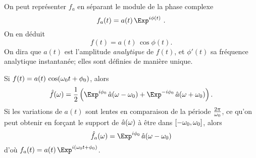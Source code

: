 On peut repr\'{e}senter $f_a$ en s\'{e}parant le module de la phase 
complexe
\[
f_a (t) = a (t)\, \Exp^{i \phi (t)}~.
\]
On en d\'{e}duit
\[
f(t) = a(t) \,\cos \phi(t) .
\]
On dira que $a(t)$ est l'amplitude {\it analytique} de $f(t)$, et 
$\phi'(t) $ sa fr\'{e}quence analytique
instantan\'{e}e; elles sont d\'{e}finies 
de mani\`{e}re unique.

\begin{Example}
\item Si $f(t) = a(t)\, \cos ({\omega}_0 t + \phi_0)$, alors
\[
\hat f (\om) =  \frac 1 2
\left(
\Exp^{i \phi_0} \, \hat a(\om - \om_0) +
\Exp^{-i \phi_0} \, \hat a(\om +\om_0)
\right).
\]
Si les variations de $a(t)$ sont lentes en comparaison de la 
p\'{e}riode $\frac {2 \pi} {{\omega}_0}$, ce qu'on peut obtenir en 
for\c{c}ant le support de
$\hat a ({\omega})$ \`{a} \^{e}tre dans $[-{\omega}_0,{\omega}_0]$, alors
\[
\hat f_a (\om) = \Exp^{i \phi_0} \, \hat a(\om - \om_0)
\]
d'o\`{u} $f_a (t) = a(t)\, \Exp^{i (\om_0 t + \phi_0)}$.
\end{Example}

